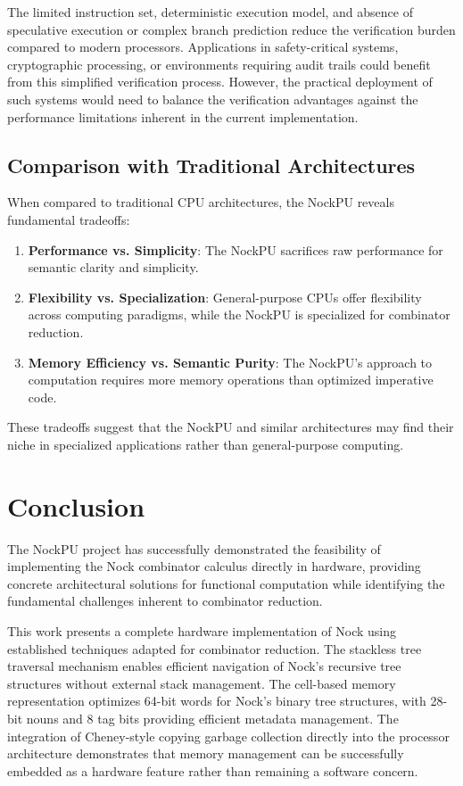 \documentclass[twoside]{article}
\begin{document}
The limited instruction set, deterministic execution model, and absence of speculative execution or complex branch prediction reduce the verification burden compared to modern processors. Applications in safety-critical systems, cryptographic processing, or environments requiring audit trails could benefit from this simplified verification process. However, the practical deployment of such systems would need to balance the verification advantages against the performance limitations inherent in the current implementation.

\subsection{Comparison with Traditional Architectures}

When compared to traditional CPU architectures, the NockPU reveals fundamental tradeoffs:

\begin{enumerate}
  \item \textbf{Performance vs. Simplicity}: The NockPU sacrifices raw performance for semantic clarity and simplicity.
  \item \textbf{Flexibility vs. Specialization}: General-purpose CPUs offer flexibility across computing paradigms, while the NockPU is specialized for combinator reduction.
  \item \textbf{Memory Efficiency vs. Semantic Purity}: The NockPU's approach to computation requires more memory operations than optimized imperative code.
\end{enumerate}

\noindent
These tradeoffs suggest that the NockPU and similar architectures may find their niche in specialized applications rather than general-purpose computing.

\section{Conclusion}

The NockPU project has successfully demonstrated the feasibility of implementing the Nock combinator calculus directly in hardware, providing concrete architectural solutions for functional computation while identifying the fundamental challenges inherent to combinator reduction.

This work presents a complete hardware implementation of Nock using established techniques adapted for combinator reduction. The stackless tree traversal mechanism enables efficient navigation of Nock's recursive tree structures without external stack management. The cell-based memory representation optimizes 64-bit words for Nock's binary tree structures, with 28-bit nouns and 8 tag bits providing efficient metadata management. The integration of Cheney-style copying garbage collection directly into the processor architecture demonstrates that memory management can be successfully embedded as a hardware feature rather than remaining a software concern.
\end{document}
